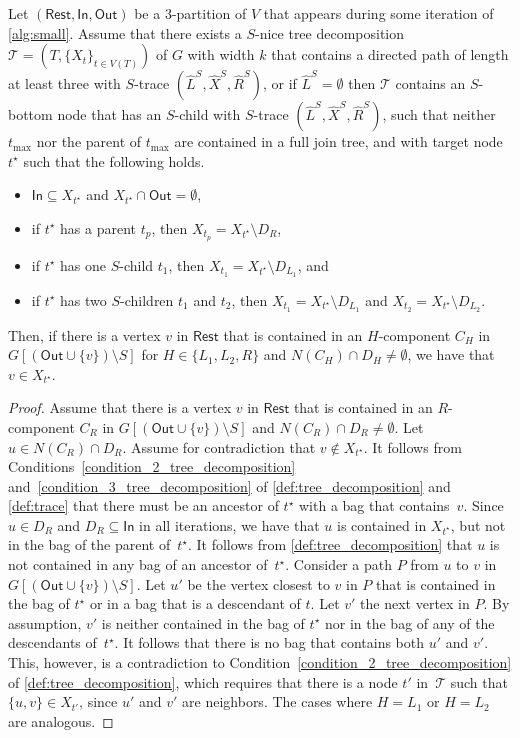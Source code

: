\documentclass[a4paper,UKenglish,cleveref, autoref, thm-restate, numberwithinsect]{lipics-v2021}
\newcommand{\slim}{\text{slim}\xspace}
\newcommand{\In}{\mathsf{In}}
\newcommand{\Out}{\mathsf{Out}}
\newcommand{\Rest}{\mathsf{Rest}}
\begin{document}
\begin{lemma}\label{lem:regularstep2}
Let $(\Rest,\In,\Out)$ be a 3-partition of $V$ that appears during some iteration of \cref{alg:small}. 
Assume that there exists a \slim $S$-nice tree decomposition $\mathcal{T}=(T,\{X_t\}_{t\in V(T)})$ of $G$ with width $k$ that contains a directed path of length at least three with $S$-trace $(\hat{L}^S, \hat{X}^S, \hat{R}^S)$, or if $\hat{L}^S=\emptyset$ then $\mathcal{T}$ contains an $S$-bottom node that has an $S$-child with $S$-trace $(\hat{L}^S, \hat{X}^S, \hat{R}^S)$, such that neither $t_{\max}$ nor the parent of $t_{\max}$ are contained in a full join tree, and with target node ${t^\star}$ such that the following holds.
\begin{itemize}
    \item $\In\subseteq X_{t^\star}$ and $X_{t^\star}\cap \Out=\emptyset$, 
    \item if $t^\star$ has a parent $t_p$, then $X_{t_p}=X_{t^\star}\setminus D_R$, 
    \item if $t^\star$ has one $S$-child $t_1$, then $X_{t_1}=X_{t^\star}\setminus D_{L_1}$, and 
    \item if $t^\star$ has two $S$-children $t_1$ and $t_2$, then $X_{t_1}=X_{t^\star}\setminus D_{L_1}$ and $X_{t_2}=X_{t^\star}\setminus D_{L_2}$.
\end{itemize} 
Then, if there is a vertex $v$ in $\Rest$ that is contained in an $H$-component $C_H$ in $G[(\Out\cup\{v\})\setminus S]$ for $H\in\{L_1,L_2,R\}$ and $N(C_H)\cap D_H\neq \emptyset$, we have that $v\in X_{t^\star}$.

\end{lemma}
\begin{proof}
Assume that there is a vertex $v$ in $\Rest$ that is contained in an $R$-component $C_R$ in $G[(\Out\cup\{v\})\setminus S]$ and $N(C_R)\cap D_R\neq \emptyset$. Let $u\in N(C_R)\cap D_R$.
Assume for contradiction that $v\notin X_{t^\star}$. 
It follows from Conditions~\ref{condition_2_tree_decomposition} and~\ref{condition_3_tree_decomposition} of \cref{def:tree_decomposition} and \cref{def:trace} that there must be an ancestor of ${t^\star}$ with a bag that contains~$v$.
Since $u\in D_R$ and $D_R\subseteq \In$ in all iterations, we have that $u$ is contained in $X_{t^\star}$, but not in the bag of the parent of~${t^\star}$. It follows from \cref{def:tree_decomposition} that $u$ is not contained in any bag of an ancestor of~${t^\star}$.
Consider a path $P$ from $u$ to $v$ in $G[(\Out\cup\{v\})\setminus S]$. Let $u'$ be the vertex closest to $v$ in $P$ that is contained in the bag of ${t^\star}$ or in a bag that is a descendant of $t$. Let $v'$ the next vertex in $P$. 
By assumption, $v'$ is neither contained in the bag of ${t^\star}$ nor in the bag of any of the descendants of~${t^\star}$. It follows that there is no bag that contains both $u'$ and $v'$. This, however, is a contradiction to Condition~\ref{condition_2_tree_decomposition} of \cref{def:tree_decomposition}, which requires that there is a node $t'$ in~$\mathcal{T}$ such that $\{u,v\}\in X_{t'}$, since $u'$ and $v'$ are neighbors.
The cases where $H=L_1$ or $H=L_2$ are analogous.
\end{proof}
\end{document}
